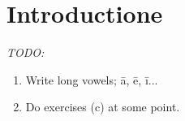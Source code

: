 
\chapter*{Introductione}
\emph{TODO:}
\begin{enumerate}[(1)]
  \item Write long vowels; \=a, \=e, \=i...
  \item Do exercises (\smallc c) at some point.
\end{enumerate}
